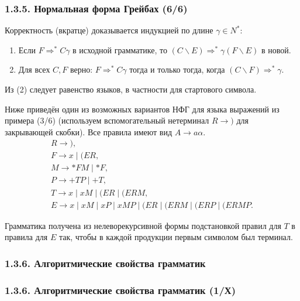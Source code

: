 \begin{frame}
\frametitle{1.3.5. Нормальная форма Грейбах (6/6)}
Корректность (вкратце) доказывается индукцией по длине $\gamma\in N^*$:
\begin{enumerate}
\item Если $F\Rightarrow^* C\gamma$ в исходной грамматике, то $(C\backslash E)\Rightarrow^* \gamma(F\backslash E)$ в новой.
\item Для всех $C,F$ верно: $F\Rightarrow^* C\gamma$ тогда и только тогда, когда $(C\backslash F)\Rightarrow^* \gamma$.
\end{enumerate}
Из (2) следует равенство языков, в частности для стартового символа.
\begin{example}
Ниже приведён один из возможных вариантов НФГ для языка выражений из примера (3/6)
(используем вспомогательный нетерминал $R\to )$ для закрывающей скобки).
Все правила имеют вид $A\to a\alpha$.
\small
\[
\begin{array}{l}
R\to ),\\
F\to x \mid (ER,\\
M\to \ast FM \mid \ast F,\\
P\to +TP \mid +T,\\[2mm]
T\to x \mid xM \mid (ER \mid (ERM,\\[2mm]
E\to x \mid xM \mid xP \mid xMP \mid (ER \mid (ERM \mid (ERP \mid (ERMP.
\end{array}
\]
\end{example}

\begin{remark}
Грамматика получена из нелеворекурсивной формы подстановкой правил для $T$ в правила для $E$
так, чтобы в каждой продукции первым символом был терминал.
\end{remark}
\end{frame}




\subsubsection{1.3.6. Алгоритмические свойства грамматик}\label{1.3.6.}
\begin{frame}
\frametitle{1.3.6. Алгоритмические свойства грамматик (1/Х)}

\end{frame}


